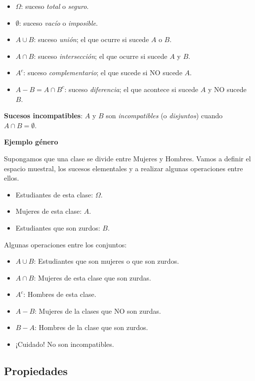 \documentclass[
  letterpaper,
  DIV=11,
  numbers=noendperiod]{scrreprt}
\providecommand{\tightlist}{%
  \setlength{\itemsep}{0pt}\setlength{\parskip}{0pt}}\usepackage{longtable,booktabs,array}
\begin{document}
\begin{itemize}
\tightlist
\item
  \(\Omega\): suceso \emph{total} o \emph{seguro}.
\item
  \(\emptyset\): suceso \emph{vacío} o \emph{imposible}.
\item
  \(A\cup B\): suceso \emph{unión}; el que ocurre si sucede \(A\) o
  \(B\).
\item
  \(A\cap B\): suceso \emph{intersección}; el que ocurre si sucede \(A\)
  y \(B\).
\item
  \(A^c\): suceso \emph{complementario}; el que sucede si NO sucede
  \(A\).
\item
  \(A- B=A\cap B^c\): suceso \emph{diferencia}; el que acontece si
  sucede \(A\) y NO sucede \(B\).
\end{itemize}

\textbf{Sucesos incompatibles}: \(A\) y \(B\) son \emph{incompatibles}
(o \emph{disjuntos}) cuando \(A\cap B=\emptyset\).

\textbf{Ejemplo género}

Supongamos que una clase se divide entre Mujeres y Hombres. Vamos a
definir el espacio muestral, los sucesos elementales y a realizar
algunas operaciones entre ellos.

\begin{itemize}
\tightlist
\item
  Estudiantes de esta clase: \(\Omega\).
\item
  Mujeres de esta clase: \(A\).
\item
  Estudiantes que son zurdos: \(B\).
\end{itemize}

Algunas operaciones entre los conjuntos:

\begin{itemize}
\tightlist
\item
  \(A\cup B\): Estudiantes que son mujeres o que son zurdos.
\item
  \(A\cap B\): Mujeres de esta clase que son zurdas.
\item
  \(A^c\): Hombres de esta clase.
\item
  \(A-B\): Mujeres de la clases que NO son zurdas.
\item
  \(B-A\): Hombres de la clase que son zurdos.
\item
  ¡Cuidado! No son incompatibles.
\end{itemize}

\hypertarget{propiedades}{%
\subsection{Propiedades}\label{propiedades}}
\end{document}
